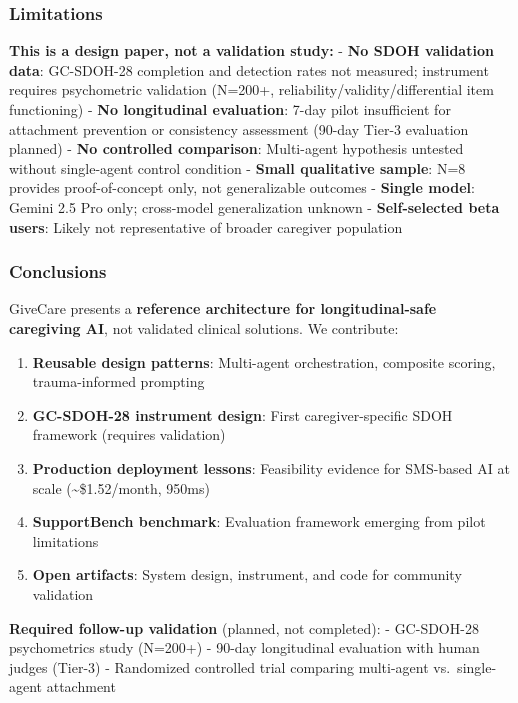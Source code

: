 \documentclass[
]{article}
\providecommand{\tightlist}{%
  \setlength{\itemsep}{0pt}\setlength{\parskip}{0pt}}
\begin{document}
\subsubsection{Limitations}\label{limitations}

\textbf{This is a design paper, not a validation study:} - \textbf{No
SDOH validation data}: GC-SDOH-28 completion and detection rates not
measured; instrument requires psychometric validation (N=200+,
reliability/validity/differential item functioning) - \textbf{No
longitudinal evaluation}: 7-day pilot insufficient for attachment
prevention or consistency assessment (90-day Tier-3 evaluation planned)
- \textbf{No controlled comparison}: Multi-agent hypothesis untested
without single-agent control condition - \textbf{Small qualitative
sample}: N=8 provides proof-of-concept only, not generalizable outcomes
- \textbf{Single model}: Gemini 2.5 Pro only; cross-model generalization
unknown - \textbf{Self-selected beta users}: Likely not representative
of broader caregiver population

\subsubsection{Conclusions}\label{conclusions}

GiveCare presents a \textbf{reference architecture for longitudinal-safe
caregiving AI}, not validated clinical solutions. We contribute:

\begin{enumerate}
\def\labelenumi{\arabic{enumi}.}
\tightlist
\item
  \textbf{Reusable design patterns}: Multi-agent orchestration,
  composite scoring, trauma-informed prompting
\item
  \textbf{GC-SDOH-28 instrument design}: First caregiver-specific SDOH
  framework (requires validation)
\item
  \textbf{Production deployment lessons}: Feasibility evidence for
  SMS-based AI at scale (\textasciitilde\$1.52/month, 950ms)
\item
  \textbf{SupportBench benchmark}: Evaluation framework emerging from
  pilot limitations
\item
  \textbf{Open artifacts}: System design, instrument, and code for
  community validation
\end{enumerate}

\textbf{Required follow-up validation} (planned, not completed): -
GC-SDOH-28 psychometrics study (N=200+) - 90-day longitudinal evaluation
with human judges (Tier-3) - Randomized controlled trial comparing
multi-agent vs.~single-agent attachment
\end{document}
